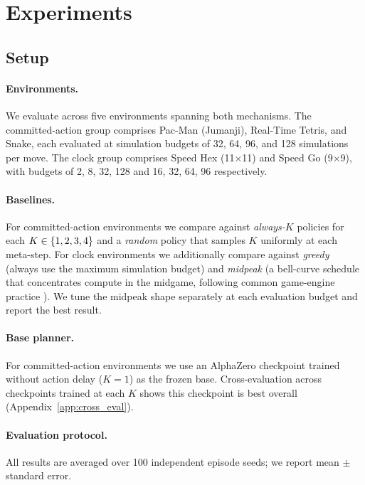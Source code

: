 \section{Experiments}
\label{sec:experiments}

\subsection{Setup}

\paragraph{Environments.}
We evaluate across five environments spanning both mechanisms.
The committed-action group comprises Pac-Man (Jumanji), Real-Time Tetris, and Snake,
each evaluated at simulation budgets of 32, 64, 96, and 128 simulations per move.
The clock group comprises Speed Hex (11$\times$11) and Speed Go (9$\times$9),
with budgets of 2, 8, 32, 128 and 16, 32, 64, 96 respectively.

\paragraph{Baselines.}
For committed-action environments we compare against \emph{always-$K$}
policies for each $K \in \{1,2,3,4\}$ and a \emph{random} policy that samples
$K$ uniformly at each meta-step. For clock environments we additionally
compare against \emph{greedy} (always use the maximum simulation
budget) and \emph{midpeak} (a bell-curve schedule that concentrates
compute in the midgame, following common game-engine practice
\cite{baier2016time, huang2010timemanagement}). We tune the midpeak
shape separately at each evaluation budget and report the best result.

\paragraph{Base planner.}
For committed-action environments we use an AlphaZero checkpoint trained without
action delay ($K{=}1$) as the frozen base.
Cross-evaluation across checkpoints trained at each $K$ shows this checkpoint
is best overall (Appendix~\ref{app:cross_eval}).

\paragraph{Evaluation protocol.}
All results are averaged over 100 independent episode seeds; we report mean $\pm$ standard error.


